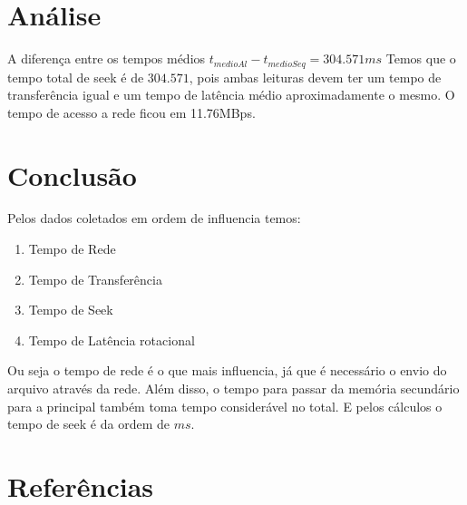 \documentclass[11pt,a4paper]{article}
\begin{document}
\section{Análise}

A diferença entre os tempos médios $t_{medioAl}-t_{medioSeq}=304.571 ms$
Temos que o tempo total de seek é de $304.571$, pois ambas leituras devem ter um tempo
de transferência igual e um tempo de latência médio aproximadamente o mesmo.
O tempo de acesso a rede ficou em 11.76MBps.

\section{Conclusão}
Pelos dados coletados  em ordem de influencia temos:
\begin{enumerate}
\item Tempo de Rede
\item Tempo de Transferência
\item Tempo de Seek
\item Tempo de Latência rotacional
\end{enumerate}

Ou seja o tempo de rede é o que mais influencia, já que é necessário o envio do arquivo através da rede. Além disso,  o tempo para passar da memória secundário para a principal também toma tempo considerável no total. E pelos cálculos o tempo de seek é da ordem de $ms$.

 \section{Referências}

\begin{small}
  
\end{small}
\end{document}
